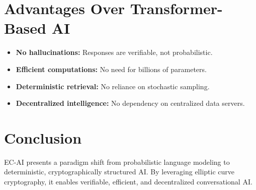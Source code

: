\documentclass{article}
\begin{document}
\section{Advantages Over Transformer-Based AI}

\begin{itemize}
    \item \textbf{No hallucinations:} Responses are verifiable, not probabilistic.
    \item \textbf{Efficient computations:} No need for billions of parameters.
    \item \textbf{Deterministic retrieval:} No reliance on stochastic sampling.
    \item \textbf{Decentralized intelligence:} No dependency on centralized data servers.
\end{itemize}

\section{Conclusion}
EC-AI presents a paradigm shift from probabilistic language modeling to deterministic, cryptographically structured AI. By leveraging elliptic curve cryptography, it enables verifiable, efficient, and decentralized conversational AI.
\end{document}
